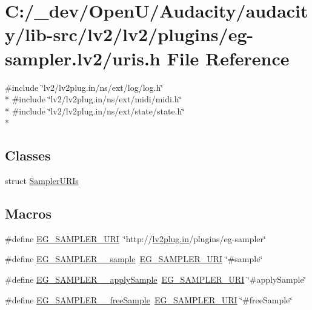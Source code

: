 \hypertarget{eg-sampler_8lv2_2uris_8h}{}\section{C\+:/\+\_\+dev/\+Open\+U/\+Audacity/audacity/lib-\/src/lv2/lv2/plugins/eg-\/sampler.lv2/uris.h File Reference}
\label{eg-sampler_8lv2_2uris_8h}
{\ttfamily \#include \char`\"{}lv2/lv2plug.\+in/ns/ext/log/log.\+h\char`\"{}}\\*
{\ttfamily \#include \char`\"{}lv2/lv2plug.\+in/ns/ext/midi/midi.\+h\char`\"{}}\\*
{\ttfamily \#include \char`\"{}lv2/lv2plug.\+in/ns/ext/state/state.\+h\char`\"{}}\\*
\subsection*{Classes}
\begin{DoxyCompactItemize}
\item 
struct \hyperlink{struct_sampler_u_r_is}{Sampler\+U\+R\+Is}
\end{DoxyCompactItemize}
\subsection*{Macros}
\begin{DoxyCompactItemize}
\item 
\#define \hyperlink{eg-sampler_8lv2_2uris_8h_a966f6b9a1ca832fd8e81525bd2be525e}{E\+G\+\_\+\+S\+A\+M\+P\+L\+E\+R\+\_\+\+U\+RI}~\char`\"{}http\+://\hyperlink{latency_8c_a7d946209d777cb95fe30364b8d321207}{lv2plug.\+in}/plugins/eg-\/sampler\char`\"{}
\item 
\#define \hyperlink{eg-sampler_8lv2_2uris_8h_aca29f23b2c8ead85288eb03aa409d6bd}{E\+G\+\_\+\+S\+A\+M\+P\+L\+E\+R\+\_\+\+\_\+sample}~\hyperlink{eg-sampler_8lv2_2uris_8h_a966f6b9a1ca832fd8e81525bd2be525e}{E\+G\+\_\+\+S\+A\+M\+P\+L\+E\+R\+\_\+\+U\+RI} \char`\"{}\#sample\char`\"{}
\item 
\#define \hyperlink{eg-sampler_8lv2_2uris_8h_aebd68df6e8439c9e7e2eafbc6d99090b}{E\+G\+\_\+\+S\+A\+M\+P\+L\+E\+R\+\_\+\+\_\+apply\+Sample}~\hyperlink{eg-sampler_8lv2_2uris_8h_a966f6b9a1ca832fd8e81525bd2be525e}{E\+G\+\_\+\+S\+A\+M\+P\+L\+E\+R\+\_\+\+U\+RI} \char`\"{}\#apply\+Sample\char`\"{}
\item 
\#define \hyperlink{eg-sampler_8lv2_2uris_8h_afdbbf16eed0fc45f07c4e30bbe103338}{E\+G\+\_\+\+S\+A\+M\+P\+L\+E\+R\+\_\+\+\_\+free\+Sample}~\hyperlink{eg-sampler_8lv2_2uris_8h_a966f6b9a1ca832fd8e81525bd2be525e}{E\+G\+\_\+\+S\+A\+M\+P\+L\+E\+R\+\_\+\+U\+RI} \char`\"{}\#free\+Sample\char`\"{}
\end{DoxyCompactItemize}


